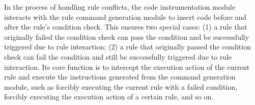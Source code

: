 In the process of handling rule conflicts, the code instrumentation module interacts with the rule command generation module to insert code before and after the rule's condition check. This ensures two special cases: (1) a rule that originally failed the condition check can pass the condition and be successfully triggered due to rule interaction; (2) a rule that originally passed the condition check can fail the condition and still be successfully triggered due to rule interaction. Its core function is to intercept the execution action of the current rule and execute the instructions generated from the command generation module, such as forcibly executing the current rule with a failed condition, forcibly executing the execution action of a certain rule, and so on.